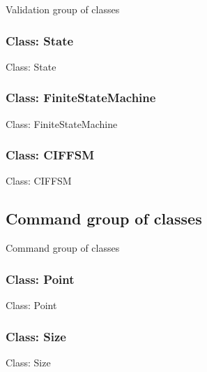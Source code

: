 \documentclass[11pt,twoside,openany,x11names,svgnames]{memoir}
\begin{document}
Validation group of classes

\subsubsection{Class: State}\label{Class-State}

Class: State

\subsubsection{Class: FiniteStateMachine}\label{Class-FiniteStateMachine}

Class: FiniteStateMachine

\subsubsection{Class: CIFFSM}\label{Class-CIFFSM}

Class: CIFFSM

\subsection{Command group of classes}\label{Command-group-of-classes}

Command group of classes

\subsubsection{Class: Point}\label{Class-Point}

Class: Point

\subsubsection{Class: Size}\label{Class-Size}

Class: Size
\end{document}
